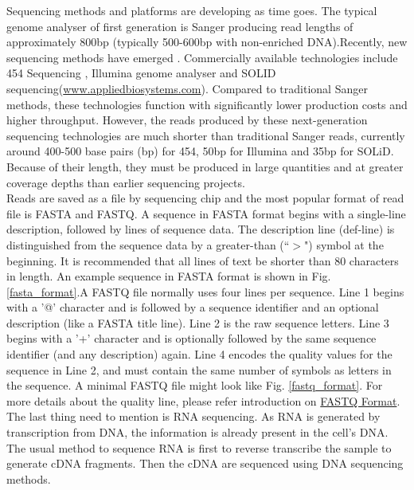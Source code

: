 \documentclass{article}
\begin{document}
\noindent Sequencing methods and platforms are developing as time goes. The typical genome analyser of first generation is Sanger\cite{sanger1977nucleotide} producing read lengths of approximately 800bp (typically 500-600bp with non-enriched DNA).Recently, new sequencing methods have emerged \cite{mardis2008impact}. Commercially available technologies include 454 Sequencing \cite{margulies2005genome}, Illumina genome analyser \cite{bentley2006whole} and SOLID sequencing(\href{www.appliedbiosystems.com}{www.appliedbiosystems.com}). Compared to traditional Sanger methods, these technologies function with significantly lower production costs and higher throughput. However, the reads produced by these next-generation sequencing technologies are much shorter than traditional Sanger reads, currently around 400-500 base pairs (bp) for 454, 50bp for Illumina and 35bp for SOLiD. Because of their length, they must be produced in large quantities and at greater coverage depths than earlier sequencing projects.\\
Reads are saved as a file by sequencing chip and the most popular format of read file is FASTA and FASTQ. A sequence in FASTA format begins with a single-line description, followed by lines of sequence data. The description line (def-line) is distinguished from the sequence data by a greater-than (``$>$") symbol at the beginning. It is recommended that all lines of text be shorter than 80 characters in length. An example sequence in FASTA format is shown in Fig. \ref{fasta_format}.A FASTQ file normally uses four lines per sequence. Line 1 begins with a '@' character and is followed by a sequence identifier and an optional description (like a FASTA title line). Line 2 is the raw sequence letters. Line 3 begins with a '+' character and is optionally followed by the same sequence identifier (and any description) again. Line 4 encodes the quality values for the sequence in Line 2, and must contain the same number of symbols as letters in the sequence. A minimal FASTQ file might look like Fig. \ref{fastq_format}. For more details about the quality line, please refer introduction on \href{http://en.wikipedia.org/wiki/FASTQ_format}{FASTQ Format}.\\
The last thing need to mention is RNA sequencing. As RNA is generated by transcription from DNA, the information is already present in the cell's DNA. The usual method to sequence RNA is first to reverse transcribe the sample to generate cDNA fragments. Then the cDNA are sequenced using DNA sequencing methods.\\
\end{document}
